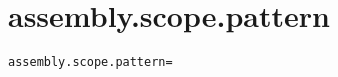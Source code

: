 \section{assembly.scope.pattern}
\label{configuration:AssemblyScopePattern}
\ClearAPI
\TODO
\begin{lstlisting}[style=Props,caption={Usage example for \textit{assembly.scope.pattern}}]
assembly.scope.pattern=
\end{lstlisting}